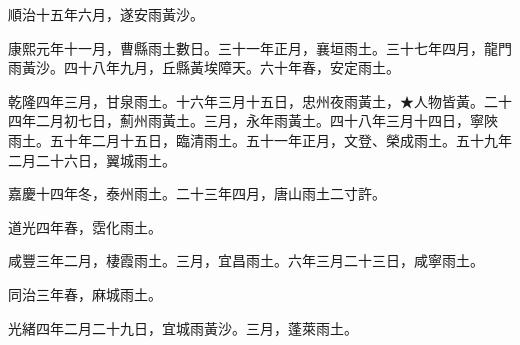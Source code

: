 \begin{pinyinscope}
順治十五年六月，遂安雨黃沙。

康熙元年十一月，曹縣雨土數日。三十一年正月，襄垣雨土。三十七年四月，龍門雨黃沙。四十八年九月，丘縣黃埃障天。六十年春，安定雨土。

乾隆四年三月，甘泉雨土。十六年三月十五日，忠州夜雨黃土，★人物皆黃。二十四年二月初七日，薊州雨黃土。三月，永年雨黃土。四十八年三月十四日，寧陜雨土。五十年二月十五日，臨清雨土。五十一年正月，文登、榮成雨土。五十九年二月二十六日，翼城雨土。

嘉慶十四年冬，泰州雨土。二十三年四月，唐山雨土二寸許。

道光四年春，霑化雨土。

咸豐三年二月，棲霞雨土。三月，宜昌雨土。六年三月二十三日，咸寧雨土。

同治三年春，麻城雨土。

光緒四年二月二十九日，宜城雨黃沙。三月，蓬萊雨土。


\end{pinyinscope}